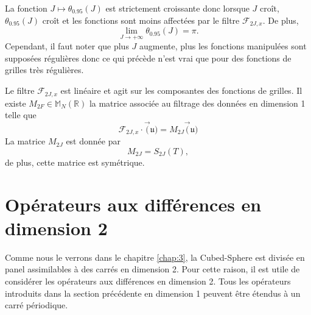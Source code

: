 La fonction $J \mapsto \theta_{0.95}(J)$ est strictement croissante donc lorsque $J$ croît, $\theta_{0.95}(J)$ croît et les fonctions sont moins affectées par le filtre $\mathcal{F}_{2J,x}$. De plus, 
\begin{equation}
\lim_{J \rightarrow +\infty} \theta_{0.95}(J) = \pi.
\end{equation}
Cependant, il faut noter que plus $J$ augmente, plus les fonctions manipulées sont supposées régulières donc ce qui précède n'est vrai que pour des fonctions de grilles très régulières.

\begin{remarque}
Le filtre $\mathcal{F}_{2J,x}$ est linéaire et agit sur les composantes des fonctions de grilles. Il existe $M_{2F} \in \mathbb{M}_N \left( \mathbb{R} \right)$ la matrice associée au filtrage des données en dimension 1 telle que
\begin{equation}
\mathcal{F}_{2J,x} \cdot \vec(\mathfrak{u}) = M_{2J} \vec(\mathfrak{u})
\end{equation}
La matrice $M_{2J}$ est donnée par
\begin{equation}
M_{2J} = S_{2J}(T),
\label{eq:matrice_filtrage}
\end{equation}
de plus, cette matrice est symétrique.
\end{remarque}































\section{Opérateurs aux différences en dimension 2}

Comme nous le verrons dans le chapitre \ref{chap:3}, la Cubed-Sphere est divisée en panel assimilables à des carrés en dimension 2. Pour cette raison, il est utile de considérer les opérateurs aux différences en dimension 2. Tous les opérateurs introduits dans la section précédente en dimension 1 peuvent être étendus à un carré périodique.


